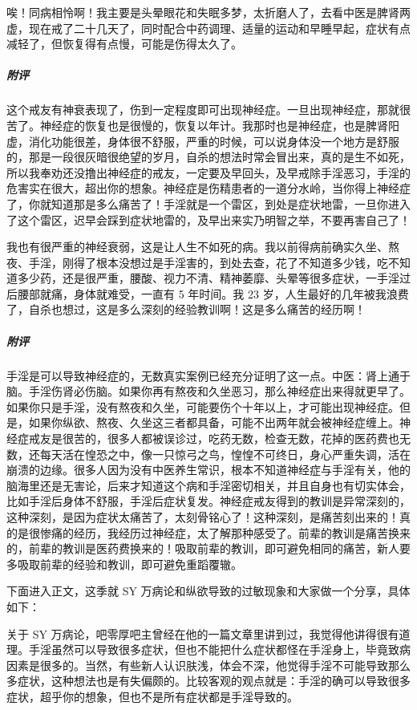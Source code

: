 \begin{case}
    唉！同病相怜啊！我主要是头晕眼花和失眠多梦，太折磨人了，去看中医是脾肾两虚，现在戒了二十几天了，同时配合中药调理、适量的运动和早睡早起，症状有点减轻了，但恢复得有点慢，可能是伤得太久了。
    \subparagraph{附评} 这个戒友有神衰表现了，伤到一定程度即可出现神经症。一旦出现神经症，那就很苦了。神经症的恢复也是很慢的，恢复以年计。我那时也是神经症，也是脾肾阳虚，消化功能很差，身体很不舒服，严重的时候，可以说身体没一个地方是舒服的，那是一段很灰暗很绝望的岁月，自杀的想法时常会冒出来，真的是生不如死，所以我奉劝还没撸出神经症的戒友，一定要及早回头，及早戒除手淫恶习，手淫的危害实在很大，超出你的想象。神经症是伤精患者的一道分水岭，当你得上神经症了，你就知道那是多么痛苦了！手淫就是一个雷区，到处是症状地雷，一旦你进入了这个雷区，迟早会踩到症状地雷的，及早出来实乃明智之举，不要再害自己了！
\end{case}

\begin{case}
    我也有很严重的神经衰弱，这是让人生不如死的病。我以前得病前确实久坐、熬夜、手淫，刚得了根本没想过是手淫害的，到处去查，花了不知道多少钱，吃不知道多少药，还是很严重，腰酸、视力不清、精神萎靡、头晕等很多症状，一手淫过后腰部就痛，身体就难受，一直有 5 年时间。我 23 岁，人生最好的几年被我浪费了，自杀也想过，这是多么深刻的经验教训啊！这是多么痛苦的经历啊！
    \subparagraph{附评} 手淫是可以导致神经症的，无数真实案例已经充分证明了这一点。中医：肾上通于脑。手淫伤肾必伤脑。如果你再有熬夜和久坐恶习，那么神经症出来得就更早了。如果你只是手淫，没有熬夜和久坐，可能要伤个十年以上，才可能出现神经症。但是，如果你纵欲、熬夜、久坐这三者都具备，可能不出两年就会被神经症缠上。神经症戒友是很苦的，很多人都被误诊过，吃药无数，检查无数，花掉的医药费也无数，还每天活在惶恐之中，像一只惊弓之鸟，惶惶不可终日，身心严重失调，活在崩溃的边缘。很多人因为没有中医养生常识，根本不知道神经症与手淫有关，他的脑海里还是无害论，后来才知道这个病和手淫密切相关，并且自身也有切实体会，比如手淫后身体不舒服，手淫后症状复发。神经症戒友得到的教训是异常深刻的，这种深刻，是因为症状太痛苦了，太刻骨铭心了！这种深刻，是痛苦刻出来的！真的是很惨痛的经历，我经历过神经症，太了解那种感受了。前辈的教训是痛苦换来的，前辈的教训是医药费换来的！吸取前辈的教训，即可避免相同的痛苦，新人要多吸取前辈的经验和教训，即可避免重蹈覆辙。
\end{case}

下面进入正文，这季就 SY 万病论和纵欲导致的过敏现象和大家做一个分享，具体如下：

关于 SY 万病论，吧零厚吧主曾经在他的一篇文章里讲到过，我觉得他讲得很有道理。手淫虽然可以导致很多症状，但也不能把什么症状都怪在手淫身上，毕竟致病因素是很多的。当然，有些新人认识肤浅，体会不深，他觉得手淫不可能导致那么多症状，这种想法也是有失偏颇的。比较客观的观点就是：手淫的确可以导致很多症状，超乎你的想象，但也不是所有症状都是手淫导致的。


